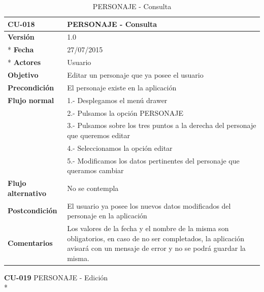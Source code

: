 \documentclass[../pfc.tex]{subfiles}
\begin{document}
		\begin{table}[H]
			\centering
			\begin{tabular}[t]{|p{3cm}|p{9.5cm}|}
				\hline \textbf{CU-018} & \textbf{PERSONAJE - Consulta} \\*
				\hline\hline \textbf{Versión} & 1.0 \\ *
				\hline\hline \textbf{Fecha} & 27/07/2015 \\ *
				\hline\textbf{Actores} 	& Usuario\\*
				\hline \textbf{Objetivo} & Editar un personaje que ya posee el usuario\\* 			
				\hline \textbf{Precondición} & El personaje existe en la aplicación\\* 
				\hline \textbf{Flujo normal} & 1.- Desplegamos el menú drawer \\* 
				& 2.- Pulsamos la opción PERSONAJE\\*	
				& 3.- Pulsamos sobre los tres puntos a la derecha del personaje que queremos editar\\*	
				& 4.- Seleccionamos la opción editar\\*	
				& 5.- Modificamos los datos pertinentes del personaje que queramos cambiar\\*	
				\hline \textbf{Flujo alternativo} & No se contempla \\* 
				\hline \textbf{Postcondición} & El usuario ya posee los nuevos datos modificados del personaje en la aplicación \\* 
				\hline \textbf{Comentarios}   & Los valores de la fecha  y el nombre de la misma son obligatorios, en caso de no ser completados, la aplicación avisará con un mensaje de error y no se podrá guardar la misma.\\*
				\hline
			\end{tabular}
			\caption{PERSONAJE - Consulta}
			\label{tabla:caso018}
		\end{table}
		
		\textbf{CU-019}	PERSONAJE - Edición\\*
		
\end{document}
